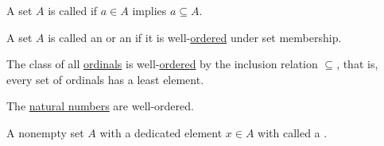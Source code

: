 \begin{definition}\label{def:transitive_set}
  A set \( A \) is called  if \( a \in A \) implies \( a \subseteq A \).
\end{definition}

\medskip

\begin{definition}\label{def:ordinal}
  A set \( A \) is called an  or an  if it is well-\hyperref[def:well_ordered_set]{ordered} under set membership.
\end{definition}

\begin{theorem}\label{thm:ordinals_are_well_ordered}
  The class of all \hyperref[def:ordinal]{ordinals} is well-\hyperref[def:well_ordered_set]{ordered} by the inclusion relation \( \subseteq \), that is, every set of ordinals has a least element.
\end{theorem}

\begin{corollary}\label{thm:natural_numbers_are_well_ordered}
  The \hyperref[def:natural_numbers]{natural numbers} are well-ordered.
\end{corollary}

\begin{definition}\label{def:pointed_set}
  A nonempty set \( A \) with a dedicated element \( x \in A \) with called a .
\end{definition}
